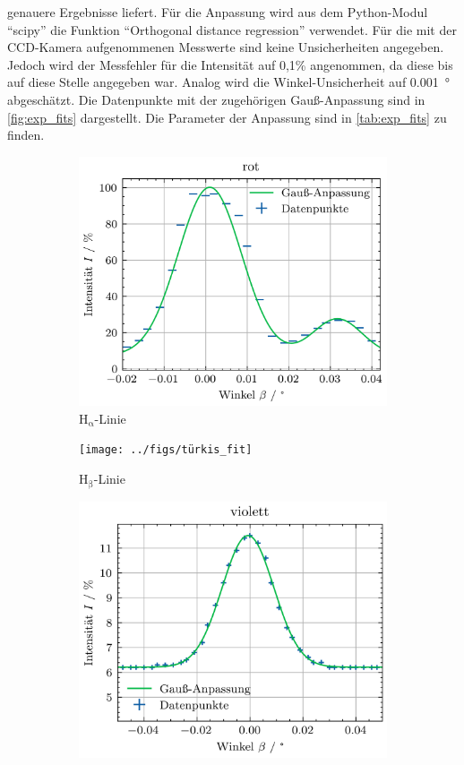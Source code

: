 genauere Ergebnisse liefert. Für die Anpassung wird aus dem Python-Modul \enquote{scipy} die Funktion \enquote{Orthogonal distance regression} verwendet.
Für die mit der CCD-Kamera aufgenommenen Messwerte sind keine Unsicherheiten angegeben. Jedoch wird der Messfehler für die Intensität auf 0,1\% angenommen, da diese
bis auf diese Stelle angegeben war. Analog wird die Winkel-Unsicherheit auf \SI{0,001}{\degree} abgeschätzt. Die Datenpunkte mit der zugehörigen Gauß-Anpassung sind
in \cref{fig:exp_fits} dargestellt. Die Parameter der Anpassung sind in \cref{tab:exp_fits} zu finden.
\begin{figure}[H]
    \centering
    \begin{subfigure}{0.45\textwidth}
        \centering
        \includegraphics[width=\linewidth]{../figs/rot_fit}
        \caption{$\mathrm{H_{\alpha}}$-Linie}
    \end{subfigure}
    \begin{subfigure}{0.45\textwidth}
        \centering
        \texttt{[image: ../figs/türkis\_fit]}
        \caption{$\mathrm{H_{\beta}}$-Linie}
    \end{subfigure}
    \begin{subfigure}{0.45\textwidth}
        \centering
        \includegraphics[width=\linewidth]{../figs/lila_fit}

\end{subfigure}
\end{figure}
